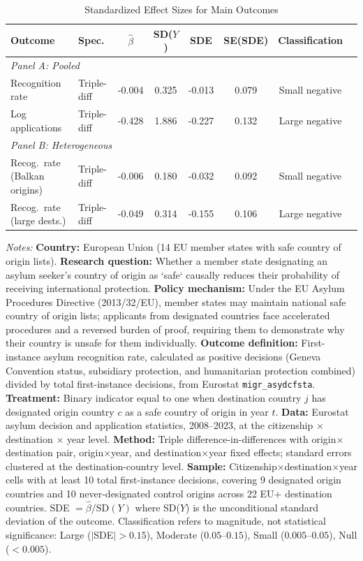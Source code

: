 \begin{table}[H]
\centering
\caption{Standardized Effect Sizes for Main Outcomes}
\label{tab:sde}
\begin{threeparttable}
\small
\begin{tabular}{llcccccl}
\toprule
Outcome & Spec. & $\hat{\beta}$ & SD($Y$) & SDE & SE(SDE) & Classification \\
\midrule
\multicolumn{7}{l}{\textit{Panel A: Pooled}} \\
Recognition rate & Triple-diff & -0.004 & 0.325 & -0.013 & 0.079 & Small negative \\
Log applications & Triple-diff & -0.428 & 1.886 & -0.227 & 0.132 & Large negative \\
\midrule
\multicolumn{7}{l}{\textit{Panel B: Heterogeneous}} \\
Recog.\ rate (Balkan origins) & Triple-diff & -0.006 & 0.180 & -0.032 & 0.092 & Small negative \\
Recog.\ rate (large dests.) & Triple-diff & -0.049 & 0.314 & -0.155 & 0.106 & Large negative \\
\bottomrule
\end{tabular}
\begin{tablenotes}[flushleft]
\small
\item \textit{Notes:} \textbf{Country:} European Union (14 EU member states with safe country of origin lists). \textbf{Research question:} Whether a member state designating an asylum seeker's country of origin as `safe` causally reduces their probability of receiving international protection. \textbf{Policy mechanism:} Under the EU Asylum Procedures Directive (2013/32/EU), member states may maintain national safe country of origin lists; applicants from designated countries face accelerated procedures and a reversed burden of proof, requiring them to demonstrate why their country is unsafe for them individually. \textbf{Outcome definition:} First-instance asylum recognition rate, calculated as positive decisions (Geneva Convention status, subsidiary protection, and humanitarian protection combined) divided by total first-instance decisions, from Eurostat \texttt{migr\_asydcfsta}. \textbf{Treatment:} Binary indicator equal to one when destination country $j$ has designated origin country $c$ as a safe country of origin in year $t$. \textbf{Data:} Eurostat asylum decision and application statistics, 2008--2023, at the citizenship $\times$ destination $\times$ year level. \textbf{Method:} Triple difference-in-differences with origin$\times$destination pair, origin$\times$year, and destination$\times$year fixed effects; standard errors clustered at the destination-country level. \textbf{Sample:} Citizenship$\times$destination$\times$year cells with at least 10 total first-instance decisions, covering 9 designated origin countries and 10 never-designated control origins across 22 EU+ destination countries. SDE $= \hat{\beta} / \text{SD}(Y)$ where SD($Y$) is the unconditional standard deviation of the outcome. Classification refers to magnitude, not statistical significance: Large ($|$SDE$| > 0.15$), Moderate ($0.05$--$0.15$), Small ($0.005$--$0.05$), Null ($< 0.005$).
\end{tablenotes}
\end{threeparttable}
\end{table}
